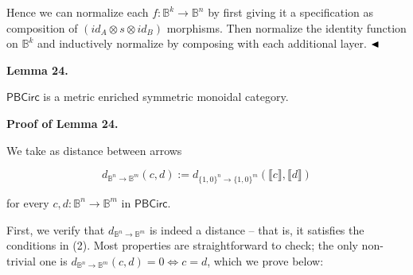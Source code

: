  
  
 
  
Hence we can normalize each $f:\mathbb{B}^{k}\to\mathbb{B}^{n}$ by first giving it a specification as composition of $(\textit{id}_{A}\otimes s\otimes\textit{id}_{B})$ morphisms. Then normalize the identity function on $\mathbb{B}^{k}$ and inductively normalize by composing with each additional layer. $\hfill\blacktriangleleft$\par
 
 
 
\par\medskip\noindent\textbf{Lemma 24.}\par
 
 
$\mathsf{PBCirc}$ is a metric enriched symmetric monoidal category.\par
 
 
 
 
 
\par\medskip\noindent\textbf{Proof of Lemma 24.}\par
 
 
We take as distance between arrows\par
  
\par  \quad  \[d_{\mathbb{B}^{n}\to\mathbb{B}^{m}}(c,d):=d_{\{1,0\}^{n}\to\{1,0\}^{m}}(\llbracket c\rrbracket,\llbracket d\rrbracket)\]\quad  \quad  
  
for every $c,d\colon\mathbb{B}^{n}\to\mathbb{B}^{m}$ in $\mathsf{PBCirc}$.\par
 
 
 
First, we verify that $d_{\mathbb{B}^{n}\to\mathbb{B}^{m}}$ is indeed a distance – that is, it satisfies the conditions in (2). Most properties are straightforward to check; the only non-trivial one is $d_{\mathbb{B}^{n}\to\mathbb{B}^{m}}(c,d)=0\iff c=d$, which we prove below:\par
  
